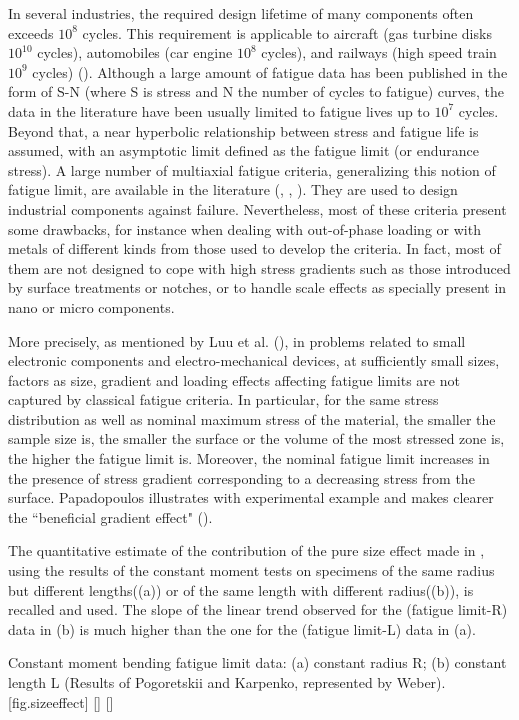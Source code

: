 In several industries, the required design lifetime of many components often exceeds $ 10^8 $ cycles. This requirement is applicable to aircraft (gas turbine disks $ 10^{10} $ cycles), automobiles (car engine $ 10^8 $ cycles), and railways (high speed train $ 10^9 $ cycles) (\cite{wachtman2009mechanical}). Although a large amount of fatigue data has been published in the form of S-N (where S is stress and N  the number of cycles to fatigue) curves, the data in the literature have been usually limited to fatigue lives up to $ 10^7 $ cycles. Beyond that, a near hyperbolic relationship between stress and fatigue life is assumed, with an asymptotic limit defined as the fatigue limit (or endurance stress). 
A large number of multiaxial fatigue criteria, generalizing this notion of fatigue limit, are available in the literature (\cite{Papadopoulos1997219}, \cite{ballard1995high}, \cite{suresh1998fatigue}). They are  used to design industrial components against failure. Nevertheless, most of these criteria present some drawbacks,  for instance when dealing with out-of-phase loading or with metals of different kinds from those used to develop the criteria. In fact, most of them are not designed to cope with high stress gradients such as those introduced  by surface treatments or notches, or to handle  scale effects as  specially present in nano or micro components. 

More precisely, as mentioned by Luu et al. (\cite{luu2014formulation}), in problems related to small electronic components and electro-mechanical devices, at sufficiently small sizes, factors as size, gradient and loading effects affecting fatigue limits are not captured by classical fatigue criteria. In particular,  for the same stress distribution as well as nominal maximum stress of the material, the smaller the sample size is, the smaller the surface or the volume of the most stressed zone is, the higher the fatigue limit is.  Moreover, the nominal fatigue limit increases in the presence of stress gradient corresponding to a decreasing stress from the surface. Papadopoulos illustrates with experimental example and makes clearer the ``beneficial gradient effect" (\cite{Papadopoulos1996513}). 

The quantitative estimate of the contribution of the pure size effect made in \cite{Papadopoulos1996513}, using the results of the constant moment tests on specimens of the same radius but different lengths((a)) or of the same length with different radius((b)), is recalled and
used. The slope of the linear trend observed for the (fatigue limit-R)
data in (b) is much higher than the one for the (fatigue limit-L) data in (a).
\begin{Figure}[!h]{Constant moment bending fatigue limit data: (a) constant radius R; (b) constant length L (Results of Pogoretskii and Karpenko\cite{Pogoretskii1966}, represented by Weber\cite{weber1999fatigue}).}[fig.sizeeffect]
\end{Figure}

